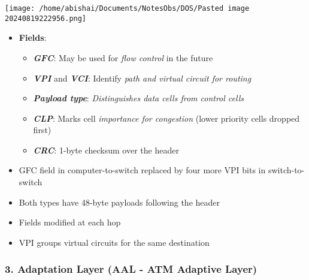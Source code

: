 \documentclass[
]{article}
\providecommand{\tightlist}{%
  \setlength{\itemsep}{0pt}\setlength{\parskip}{0pt}}
\begin{document}
\texttt{[image: /home/abishai/Documents/NotesObs/DOS/Pasted image 20240819222956.png]}

\begin{itemize}
\tightlist
\item
  \textbf{Fields}:

  \begin{itemize}
  \tightlist
  \item
    \textbf{\emph{GFC}}: May be used for \emph{flow control} in the
    future
  \item
    \textbf{\emph{VPI}} and \textbf{\emph{VCI}}: Identify \emph{path and
    virtual circuit for routing}
  \item
    \textbf{\emph{Payload type}}: \emph{Distinguishes data cells from
    control cells}
  \item
    \textbf{\emph{CLP}}: Marks cell \emph{importance for congestion}
    (lower priority cells dropped first)
  \item
    \textbf{\emph{CRC}}: 1-byte checksum over the header
  \end{itemize}
\item
  GFC field in computer-to-switch replaced by four more VPI bits in
  switch-to-switch
\item
  Both types have 48-byte payloads following the header
\item
  Fields modified at each hop
\item
  VPI groups virtual circuits for the same destination
\end{itemize}

\hypertarget{adaptation-layer-aal---atm-adaptive-layer}{%
\subsubsection{3. Adaptation Layer (AAL - ATM Adaptive
Layer)}\label{adaptation-layer-aal---atm-adaptive-layer}}
\end{document}
